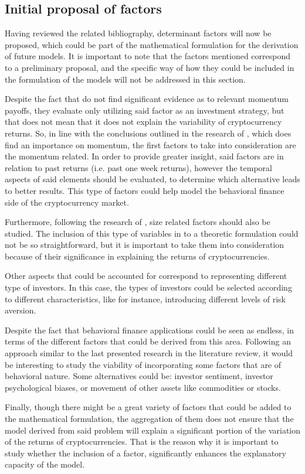\subsection{Initial proposal of factors}
Having reviewed the related bibliography, determinant factors will now be proposed, which could be part of the mathematical formulation for the derivation of future models. It is important to note that the factors mentioned correspond to a preliminary proposal, and the specific way of how they could be included in the formulation of the models will not be addressed in this section.

Despite the fact that \parencite{GROBYS20196} do not find significant evidence as to relevant momentum payoffs, they evaluate only utilizing said factor as an investment strategy, but that does not mean that it does not explain the variability of cryptocurrency returns. So, in line with the conclusions outlined in the research of \parencite{liu2022common}, which does find an importance on momentum, the first factors to take into consideration are the momentum related. In order to provide greater insight, said factors are in relation to past returns (i.e. past one week returns), however the temporal aspects of said elements should be evaluated, to determine which alternative leads to better results. This type of factors could help model the behavioral finance side of the cryptocurrency market.

Furthermore, following the research of \parencite{liu2022common}, size related factors should also be studied. The inclusion of this type of variables in to a theoretic formulation could not be so straightforward, but it is important to take them into consideration because of their significance in explaining the returns of cryptocurrencies. 

Other aspects that could be accounted for correspond to representing different type of investors. In this case, the types of investors could be selected according to different characteristics, like for instance, introducing different levels of risk aversion.

Despite the fact that behavioral finance applications could be seen as endless, in terms of the different factors that could be derived from this area. Following an approach similar to the last presented research \parencite{Bennett2023} in the literature review, it would be interesting to study the viability of incorporating some factors that are of behavioral nature. Some alternatives could be: investor sentiment, investor psychological biases, or movement of other assets like commodities or stocks.

Finally, though there might be a great variety of factors that could be added to the mathematical formulation, the aggregation of them does not ensure that the model derived from said problem will explain a significant portion of the variation of the returns of cryptocurrencies. That is the reason why it is important to study whether the inclusion of a factor, significantly enhances the explanatory capacity of the model.
